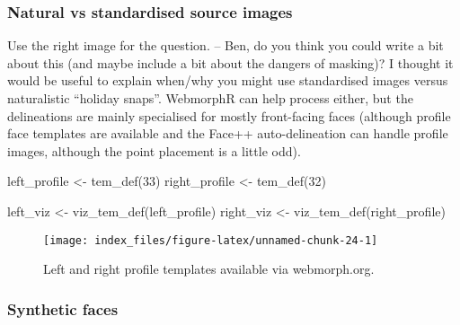 \documentclass[
  doc,floatsintext]{apa6}
\newenvironment{Shaded}{\begin{snugshade}}{\end{snugshade}}
\newcommand{\DecValTok}[1]{\textcolor[rgb]{0.00,0.00,0.81}{#1}}
\newcommand{\FunctionTok}[1]{\textcolor[rgb]{0.00,0.00,0.00}{#1}}
\newcommand{\NormalTok}[1]{#1}
\newcommand{\OtherTok}[1]{\textcolor[rgb]{0.56,0.35,0.01}{#1}}
\begin{document}
\hypertarget{natural-vs-standardised-source-images}{%
\subsubsection{Natural vs standardised source images}\label{natural-vs-standardised-source-images}}

Use the right image for the question. -- Ben, do you think you could write a bit about this (and maybe include a bit about the dangers of masking)? I thought it would be useful to explain when/why you might use standardised images versus naturalistic ``holiday snaps''. WebmorphR can help process either, but the delineations are mainly specialised for mostly front-facing faces (although profile face templates are available and the Face++ auto-delineation can handle profile images, although the point placement is a little odd).

\begin{Shaded}
\begin{Highlighting}[]
\NormalTok{left\_profile }\OtherTok{\textless{}{-}} \FunctionTok{tem\_def}\NormalTok{(}\DecValTok{33}\NormalTok{)}
\NormalTok{right\_profile }\OtherTok{\textless{}{-}} \FunctionTok{tem\_def}\NormalTok{(}\DecValTok{32}\NormalTok{)}

\NormalTok{left\_viz }\OtherTok{\textless{}{-}} \FunctionTok{viz\_tem\_def}\NormalTok{(left\_profile)}
\NormalTok{right\_viz }\OtherTok{\textless{}{-}} \FunctionTok{viz\_tem\_def}\NormalTok{(right\_profile)}
\end{Highlighting}
\end{Shaded}

\begin{figure}
\texttt{[image: index\_files/figure-latex/unnamed-chunk-24-1]} \caption{Left and right profile templates available via webmorph.org.}\label{fig:unnamed-chunk-24}
\end{figure}

\hypertarget{synthetic-faces}{%
\subsubsection{Synthetic faces}\label{synthetic-faces}}
\end{document}
